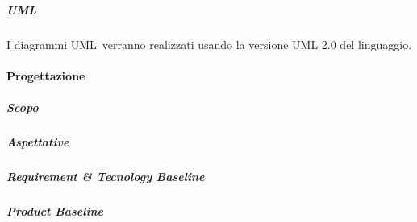             \subparagraph{UML} \label{subparagraph:UML}
            I diagrammi UML\glo\ verranno realizzati usando la versione UML 2.0 del linguaggio.
          
        \paragraph{Progettazione} \label{paragraph:Progettazione}

            \subparagraph{Scopo} \label{subparagraph:Scopo}

            \subparagraph{Aspettative} \label{subparagraph:Aspettative}

            \subparagraph{Requirement \& Tecnology Baseline} \label{subparagraph:Requirement_Tecnology Baseline}

            \subparagraph{Product Baseline} \label{subparagraph:Product Baseline}

            

